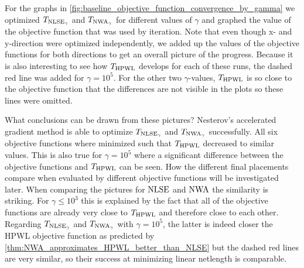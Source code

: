 For the graphs in \cref{fig:baseline_objective_function_convergence_by_gamma}
we optimized \(T_{\operatorname{NLSE}_\gamma}\) and \(T_{\operatorname{NWA}_\gamma}\) for different values of \(\gamma\)
and graphed the value of the objective function that was used by iteration.
Note that even though x- and y-direction were optimized independently, we added up the values of the objective functions
for both directions to get an overall picture of the progress.
Because it is also interesting to see how \(T_{\operatorname{HPWL}}\) develops for each of these
runs, the dashed red line was added for \(\gamma = 10^5\).
For the other two \(\gamma\)-values, \(T_{\operatorname{HPWL}}\) is so close to the objective function 
that the differences are not visible in the plots so these lines were omitted.

What conclusions can be drawn from these pictures?
Nesterov's accelerated gradient method is able to optimize \(T_{\operatorname{NLSE}_\gamma}\) and \(T_{\operatorname{NWA}_\gamma}\) successfully.
All six objective functions where minimized such that \(T_{\operatorname{HPWL}}\) decreased to similar values.
This is also true for \(\gamma = 10^5\) where a significant difference between the objective functions
and \(T_{\operatorname{HPWL}}\) can be seen.
How the different final placements compare when evaluated by different objective functions will be investigated later.
When comparing the pictures for \(\operatorname{NLSE}\) and \(\operatorname{NWA}\) the similarity is striking.
For \(\gamma \leq 10^3\) this is explained by the fact that all of the objective functions
are already very close to \(T_{\operatorname{HPWL}}\) and therefore close to each other.
Regarding \(T_{\operatorname{NLSE}_\gamma}\) and \(T_{\operatorname{NWA}_\gamma}\) with \(\gamma = 10^5\),
the latter is indeed closer the HPWL objective function as predicted by \cref{thm:NWA_approximates_HPWL_better_than_NLSE}
but the dashed red lines are very similar,
so their success at minimizing linear netlength is comparable.

